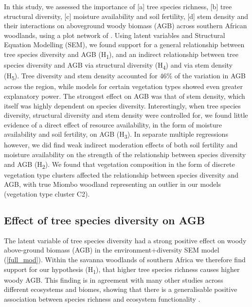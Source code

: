 \documentclass[11pt,a4paper]{article}
\begin{document}
In this study, we assessed the importance of [a] tree species richness, [b] tree structural diversity, [c] moisture availability and soil fertility, [d] stem density and their interactions on aboveground woody biomass (AGB) across southern African woodlands, using a plot network of \nplots{}. Using latent variables and Structural Equation Modelling (SEM), we found support for a general relationship between tree species diversity and AGB (H\textsubscript{1}), and an indirect relationship between tree species diversity and AGB via structural diversity (H\textsubscript{4}) and via stem density (H\textsubscript{5}). Tree diversity and stem density accounted for 46\% of the variation in AGB across the region, while models for certain vegetation types showed even greater explanatory power. The strongest effect on AGB was that of stem density, which itself was highly dependent on species diversity. Interestingly, when tree species diversity, structural diversity and stem density were controlled for, we found little evidence of a direct effect of resource availability, in the form of moisture availability and soil fertility, on AGB (H\textsubscript{3}). In separate multiple regressions however, we did find weak indirect moderation effects of both soil fertility and moisture availability on the strength of the relationship between species diversity and AGB (H\textsubscript{2}). We found that vegetation composition in the form of discrete vegetation type clusters affected the relationship between species diversity and AGB, with true Miombo woodland representing an outlier in our models (vegetation type cluster C2).


\subsection{Effect of tree species diversity on AGB}

The latent variable of tree species diversity had a strong positive effect on woody above-ground biomass (AGB) in the environment+diversity SEM model (\autoref{full_mod}). Within the savanna woodlands of southern Africa we therefore find support for our hypothesis (H\textsubscript{1}), that higher tree species richness causes higher woody AGB. This finding is in agreement with many other studies across different ecosystems and biomes, showing that there is a generalisable positive association between species richness and ecosystem functionality \citep{Liang2016, Cardinale2009}. 
\end{document}

